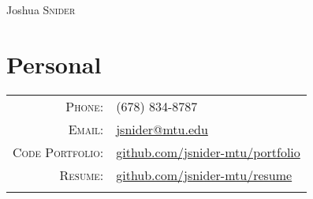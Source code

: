 \documentclass[a4paper,9pt]{extarticle}
\begin{document}
\pagestyle{empty}

\par{\centering
                {\Huge Joshua \textsc{Snider}
        }\bigskip\par}
\section{Personal}
\begin{tabular}{rl}
    \textsc{Phone:}          & (678) 834-8787\\
    \textsc{Email:}          & \href{mailto:jsnider@mtu.edu}{jsnider@mtu.edu}\\
    \textsc{Code Portfolio:} & \href{github.com/jsnider-mtu/portfolio}{github.com/jsnider-mtu/portfolio}\\
    \textsc{Resume:}         & \href{github.com/jsnider-mtu/resume}{github.com/jsnider-mtu/resume}\\
    \multicolumn{2}{c}{}\\
\end{tabular}
\end{document}
